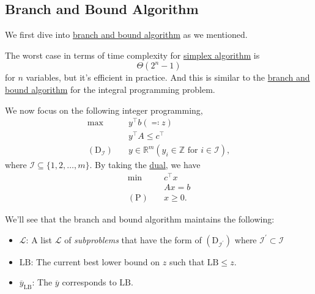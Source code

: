 \subsection{Branch and Bound Algorithm}\label{subsec:branch-and-bound}
We first dive into \hyperref[eg:branch-and-bound]{branch and bound algorithm} as we mentioned.
\begin{prev}
	The worst case in terms of time complexity for \hyperref[algo:simplex-algorithm]{simplex algorithm} is
	\[
		\Theta(2^n - 1)
	\]
	for \(n\) variables, but it's efficient in practice. And this is similar to the \hyperref[eg:branch-and-bound]{branch and bound algorithm} for the integral programming problem.
\end{prev}

We now focus on the following integer programming,
\[
	\begin{aligned}
		\max~                            & y^{\top}b(\eqqcolon z)                                              \\
		                                 & y^{\top}A\leq c^{\top}                                              \\
		(\mathrm{D}_{\mathcal{I} })\quad & y\in\mathbb{R}^m(y_{i}\in\mathbb{Z} \text{ for } i\in \mathcal{I}),
	\end{aligned}
\]
where \(\mathcal{I} \subseteq \{1, 2, \ldots , m\}\). By taking the \hyperref[def:dual]{dual}, we have
\[
	\begin{aligned}
		\min~             & c^{\top}x \\
		                  & Ax = b    \\
		(\mathrm{P})\quad & x\geq 0.
	\end{aligned}
\]

We'll see that the branch and bound algorithm maintains the following:
\begin{itemize}
	\item \(\mathcal{L} \): A list \(\mathcal{L} \) of \emph{subproblems} that have the form of \((\mathrm{D}_{\mathcal{I}^\prime})\) where \(\mathcal{I} ^\prime \subset \mathcal{I}\)
	\item \(\mathrm{LB} \): The current best lower bound on \(z\) such that \(\mathrm{LB}\leq z \).
	\item \(\overline{y}_{\mathrm{LB}}\): The \(\overline{y}\) corresponds to \(\mathrm{LB}\).
\end{itemize}

